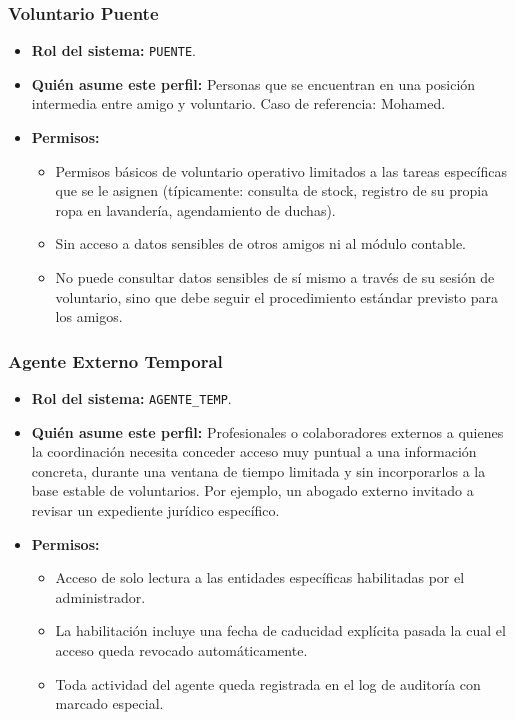 \subsubsection{Voluntario Puente}
\begin{itemize}
    \item \textbf{Rol del sistema:} \texttt{PUENTE}.
    
    \item \textbf{Quién asume este perfil:} Personas que se encuentran en una posición
    intermedia entre amigo y voluntario. Caso de referencia: Mohamed.
    
    \item \textbf{Permisos:}
    \begin{itemize}
        \item Permisos básicos de voluntario operativo limitados a las tareas
        específicas que se le asignen (típicamente: consulta de stock,
        registro de su propia ropa en lavandería, agendamiento de duchas).
        \item Sin acceso a datos sensibles de otros amigos ni al módulo contable.
        \item No puede consultar datos sensibles de
        sí mismo a través de su sesión de voluntario, sino que debe seguir el
        procedimiento estándar previsto para los amigos.
    \end{itemize}
\end{itemize}


\subsubsection{Agente Externo Temporal}
\begin{itemize}
    \item \textbf{Rol del sistema:} \texttt{AGENTE\_TEMP}.
    
    \item \textbf{Quién asume este perfil:} Profesionales o colaboradores externos a
    quienes la coordinación necesita conceder acceso muy puntual a una
    información concreta, durante una ventana de tiempo limitada y sin
    incorporarlos a la base estable de voluntarios. Por ejemplo, un abogado
    externo invitado a revisar un expediente jurídico específico.
    
    \item \textbf{Permisos:}
    \begin{itemize}
        \item Acceso de solo lectura a las entidades específicas habilitadas por el administrador.
        \item La habilitación incluye una fecha de caducidad explícita pasada la
        cual el acceso queda revocado automáticamente.
        \item Toda actividad del agente queda registrada en el log de auditoría con
        marcado especial.
    \end{itemize}
\end{itemize}


